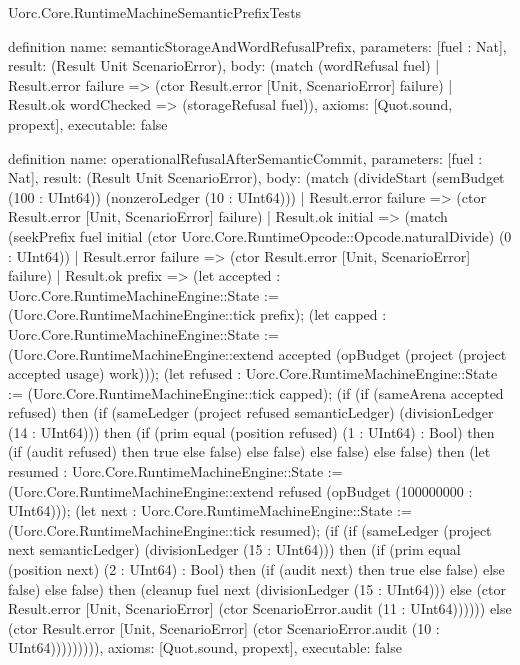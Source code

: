 \begin{lexlean}{Uorc.Core.RuntimeMachineSemanticPrefixTests}
\begin{semanticmodule}
definition{
  name: semanticStorageAndWordRefusalPrefix,
  parameters: [fuel : Nat],
  result: (Result Unit ScenarioError),
  body: (match (wordRefusal fuel)
    | Result.error failure => (ctor Result.error [Unit, ScenarioError] failure)
    | Result.ok wordChecked => (storageRefusal fuel)),
  axioms: [Quot.sound, propext],
  executable: false
}

definition{
  name: operationalRefusalAfterSemanticCommit,
  parameters: [fuel : Nat],
  result: (Result Unit ScenarioError),
  body: (match (divideStart (semBudget (100 : UInt64)) (nonzeroLedger (10 : UInt64)))
    | Result.error failure => (ctor Result.error [Unit, ScenarioError] failure)
    | Result.ok initial => (match (seekPrefix fuel initial (ctor Uorc.Core.RuntimeOpcode::Opcode.naturalDivide) (0 : UInt64))
      | Result.error failure => (ctor Result.error [Unit, ScenarioError] failure)
      | Result.ok prefix => (let accepted : Uorc.Core.RuntimeMachineEngine::State := (Uorc.Core.RuntimeMachineEngine::tick prefix); (let capped : Uorc.Core.RuntimeMachineEngine::State := (Uorc.Core.RuntimeMachineEngine::extend accepted (opBudget (project (project accepted usage) work))); (let refused : Uorc.Core.RuntimeMachineEngine::State := (Uorc.Core.RuntimeMachineEngine::tick capped); (if (if (sameArena accepted refused) then (if (sameLedger (project refused semanticLedger) (divisionLedger (14 : UInt64))) then (if (prim equal (position refused) (1 : UInt64) : Bool) then (if (audit refused) then true else false) else false) else false) else false) then (let resumed : Uorc.Core.RuntimeMachineEngine::State := (Uorc.Core.RuntimeMachineEngine::extend refused (opBudget (100000000 : UInt64))); (let next : Uorc.Core.RuntimeMachineEngine::State := (Uorc.Core.RuntimeMachineEngine::tick resumed); (if (if (sameLedger (project next semanticLedger) (divisionLedger (15 : UInt64))) then (if (prim equal (position next) (2 : UInt64) : Bool) then (if (audit next) then true else false) else false) else false) then (cleanup fuel next (divisionLedger (15 : UInt64))) else (ctor Result.error [Unit, ScenarioError] (ctor ScenarioError.audit (11 : UInt64)))))) else (ctor Result.error [Unit, ScenarioError] (ctor ScenarioError.audit (10 : UInt64))))))))),
  axioms: [Quot.sound, propext],
  executable: false
}


\end{semanticmodule}
\end{lexlean}

